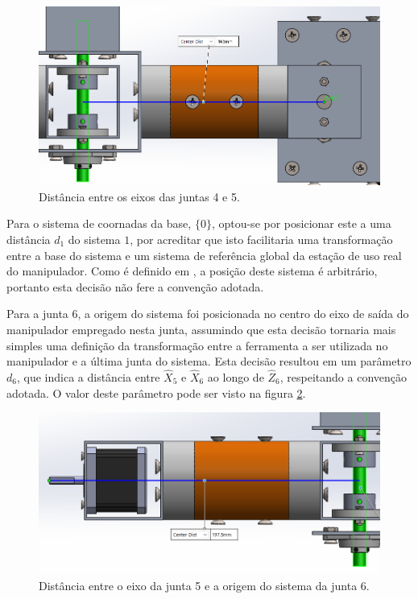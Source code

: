 \begin{figure}[ht]
    \caption{Distância entre os eixos das juntas 4 e 5.}    
    \begin{centering}

        \includegraphics[width=0.9\columnwidth]{images/a4.png}
    
    \par\end{centering}

    \label{fig:a4}
\end{figure}

Para o sistema de coornadas da base, $\{0\}$, optou-se por posicionar este a uma distância $d_1$ do sistema ${1}$, 
por acreditar que isto facilitaria uma transformação entre a base do sistema e um sistema de referência global
da estação de uso real do manipulador. 
Como é definido em \cite{craig2009introduction}, a posição deste sistema é arbitrário, portanto
esta decisão não fere a convenção adotada.

Para a junta 6, a origem do sistema foi posicionada no centro do eixo de saída do manipulador empregado nesta 
junta, assumindo que esta decisão tornaria mais simples uma definição da transformação entre a ferramenta a 
ser utilizada no manipulador e a última junta do sistema. Esta decisão resultou em um parâmetro $d_6$, que 
indica a distância entre $\hat{X}_5$ e $\hat{X}_6$ ao longo de $\hat{Z}_6$, respeitando a convenção adotada.
O valor deste parâmetro pode ser visto na figura \ref{fig:d6}.

\begin{figure}[ht]
    \caption{Distância entre o eixo da junta 5 e a origem do sistema da junta 6.}    
    \begin{centering}

        \includegraphics[width=0.9\columnwidth]{images/d6.png}
    
    \par\end{centering}

    \label{fig:d6}
\end{figure}